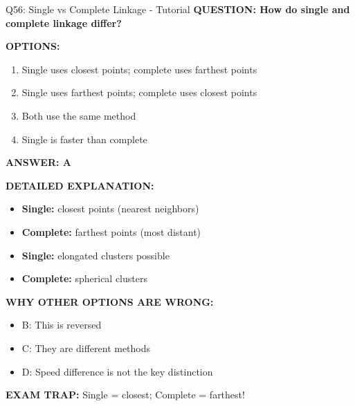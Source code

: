 \documentclass[8pt]{beamer}
\begin{document}
	\begin{frame}{Q56: Single vs Complete Linkage - Tutorial}
		\fontsize{6.5}{7.5}\selectfont
		\textbf{QUESTION: How do single and complete linkage differ?}
		
		\vspace{0.1cm}
		\textbf{OPTIONS:}
		\begin{enumerate}
			\item Single uses closest points; complete uses farthest points
			\item Single uses farthest points; complete uses closest points
			\item Both use the same method
			\item Single is faster than complete
		\end{enumerate}
		
		\vspace{0.1cm}
		\textcolor{myblue}{\textbf{ANSWER: A}}
		
		\vspace{0.1cm}
		\textbf{DETAILED EXPLANATION:}
		\begin{itemize}
			\item \textbf{Single:} closest points (nearest neighbors)
			\item \textbf{Complete:} farthest points (most distant)
			\item \textbf{Single:} elongated clusters possible
			\item \textbf{Complete:} spherical clusters
		\end{itemize}
		
		\vspace{0.1cm}
		\textcolor{myred}{\textbf{WHY OTHER OPTIONS ARE WRONG:}}
		\begin{itemize}
			\item \textcolor{myred}{B:} This is reversed
			\item \textcolor{myred}{C:} They are different methods
			\item \textcolor{myred}{D:} Speed difference is not the key distinction
		\end{itemize}
		
		\textcolor{myred}{\textbf{EXAM TRAP:}} Single = \textcolor{myblue}{closest}; Complete = \textcolor{myblue}{farthest}!
	\end{frame}
	
\end{document}
